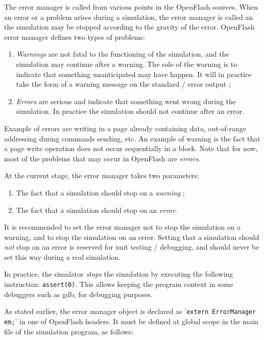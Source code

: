 The error manager is called from various points in the OpenFlash sources. When an error or a problem arises during a simulation, the error manager is called an the simulation may be stopped according to the gravity of the error. OpenFlash error manager defines two types of problems:

\begin{enumerate}
  \item \emph{Warnings} are not fatal to the functioning of the simulation, and the simulation may continue after a warning. The role of the warning is to indicate that something unanticipated may have happen. It will in practice take the form of a warning message on the standard / error output ;
  \item \emph{Errors} are serious and indicate that something went wrong during the simulation. In practice the simulation should not continue after an error.
\end{enumerate}

Example of errors are writing in a page already containing data, out-of-range addressing during commands sending, etc. An example of warning is the fact that a page write operation does not occur sequentially in a block. Note that for now, most of the problems that may occur in OpenFlash are \emph{errors}.

At the current stage, the error manager takes two parameters:

\begin{enumerate}
  \item The fact that a simulation should stop on a \emph{warning} ;
  \item The fact that a simulation should stop on an \emph{error}.
\end{enumerate}

It is recommended to set the error manager not to stop the simulation on a warning, and to stop the simulation on an error. Setting that a simulation should \emph{not} stop on an error is reserved for unit testing / debugging, and should never be set this way during a real simulation.

In practice, the simulator \emph{stops} the simulation by executing the following instruction: \verb+assert(0)+. This allows keeping the program context in some debuggers such as gdb, for debugging purposes.

As stated earlier, the error manager object is declared as '\verb+extern ErrorManager em;+' in one of OpenFlash headers. It must be defined at global scope in the main file of the simulation program, as follows:

